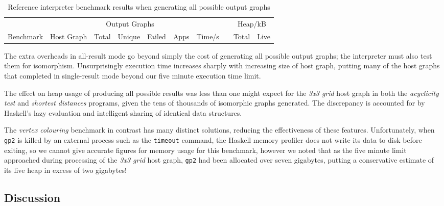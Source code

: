 \begin{table}[t]
\begin{minipage}{\textwidth}
\centering

\begin{tabular}{llrrrrrcrr}
\hline 
&  & \multicolumn{3}{c}{Output Graphs} & & && \multicolumn{2}{c}{Heap/kB}\\
Benchmark          & Host Graph & Total & Unique   & Failed & Apps & Time/s   & & Total  & Live \\
\hline 

\end{tabular}

\caption[Reference interpreter benchmarks]{Reference interpreter benchmark results when generating all possible output graphs}

\label{table:resultsAll}
\end{minipage}
\end{table}

The extra overheads in all-result mode go beyond simply the cost of generating all possible output graphs; the interpreter must also test them for isomorphism. Unsurprisingly execution time increases sharply with increasing size of host graph, putting many of the host graphs that completed in single-result mode beyond our five minute execution time limit.

The effect on heap usage of producing all possible results was less than one might expect for the \textit{3x3 grid} host graph in both the \textit{acyclicity test} and \textit{shortest distances} programs, given the tens of thousands of isomorphic graphs generated. The discrepancy is accounted for by Haskell's lazy evaluation and intelligent sharing of identical data structures.

The \textit{vertex colouring} benchmark in contrast has many distinct solutions, reducing the effectiveness of these features. Unfortunately, when \texttt{gp2} is killed by an external process such as the \texttt{timeout} command, the Haskell memory profiler does not write its data to disk before exiting, so we cannot give accurate figures for memory usage for this benchmark, however we noted that as the five minute limit approached during processing of the \textit{3x3 grid} host graph, \texttt{gp2} had been allocated over seven gigabytes, putting a conservative estimate of its live heap in excess of two gigabytes!


\subsection{Discussion}

